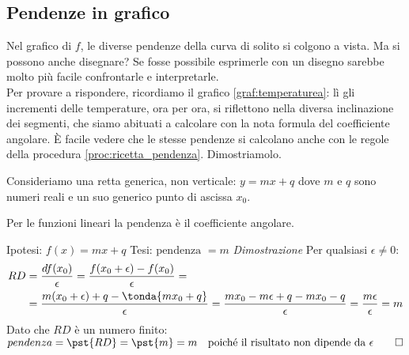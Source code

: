 \subsection{Pendenze in grafico}
\label{subsec:pendenze_grafico}
Nel grafico di \(f\), le diverse pendenze della curva di solito si colgono a 
vista. Ma si possono anche disegnare? Se fosse possibile esprimerle con un 
disegno sarebbe molto più facile confrontarle e interpretarle.\\
Per provare a rispondere, ricordiamo il grafico \ref{graf:temperaturea}: 
lì gli incrementi delle temperature, ora per ora, si riflettono nella 
diversa inclinazione dei segmenti, che siamo abituati a calcolare con la 
nota formula del coefficiente angolare. 
È facile vedere che le stesse pendenze si calcolano anche con le 
regole della procedura \ref{proc:ricetta_pendenza}. 
Dimostriamolo. 

Consideriamo una retta generica, non verticale: \(y=mx+q\) 
dove \(m\) e \(q\) sono numeri reali 
e un suo generico punto di ascissa \(x_0\).
\begin{teorema}
\label{teo:pendenza_retta}
  Per le funzioni lineari la pendenza è il coefficiente angolare.
\end{teorema}
\noindent Ipotesi: \(f(x)=mx+q\) \tab Tesi: \(\text{pendenza }=m\)
\emph{Dimostrazione}
Per qualsiasi \(\epsilon\ne 0\):
\begin{align*}
RD &=\dfrac{df(x_0)}{\epsilon} =\dfrac{f(x_0+\epsilon)-f(x_0)}{\epsilon}=\\
               &=\dfrac{m(x_0+\epsilon)+q-\tonda{mx_0+q}}{\epsilon}=
                 \dfrac{mx_0-m\epsilon+q-mx_0-q}{\epsilon}=
                 \dfrac{m\epsilon}{\epsilon}=m
\end{align*}
Dato che \(RD\) è un numero finito:\\
\(pendenza = \pst{RD}= \pst{m}=m 
\quad \text{poiché il risultato non dipende da } \epsilon
\hfill \qed\)

